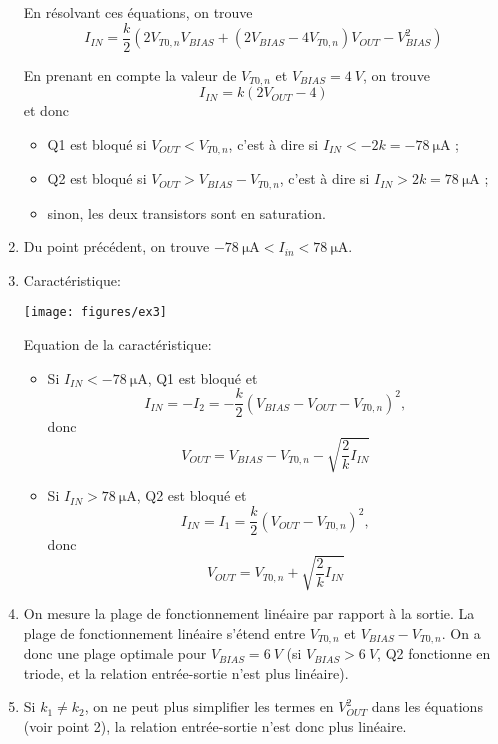 \begin{enumerate}
	En résolvant ces équations, on trouve
	\[I_{IN} = \frac{k}{2}\left(2 V_{T0,n} V_{BIAS} + (2 V_{BIAS} - 4 V_{T0,n}) V_{OUT} - V_{BIAS}
	^2\right)\]

	En prenant en compte la valeur de $V_{T0,n}$ et $V_{BIAS} = \SI{4}{V}$, on trouve
	\[I_{IN} = k\left(2 V_{OUT} - 4\right)\]
	et donc
	\begin{itemize}
		\item Q1 est bloqué si $V_{OUT} < V_{T0,n}$, c'est à dire si
		$I_{IN} < -2k = -\SI{78}{\micro\ampere}$ ;
		\item Q2 est bloqué si $V_{OUT} > V_{BIAS} - V_{T0,n}$, c'est à dire si
		$I_{IN} > 2k = \SI{78}{\micro\ampere}$ ;
		\item sinon, les deux transistors sont en saturation.
	\end{itemize}

	\item Du point précédent, on trouve $-\SI{78}{\micro\ampere} < I_{in} < \SI{78}{\micro\ampere}$.

	\item Caractéristique:
	\begin{center}
		\texttt{[image: figures/ex3]}
	\end{center}

	Equation de la caractéristique:
	\begin{itemize}
    	\item Si $I_{IN} < \SI{-78}{\micro\ampere}$, Q1 est bloqué et
        \[I_{IN} = - I_2 = -\frac{k}{2}\left(V_{BIAS} - V_{OUT} - V_{T0,n}\right)^2,\]
        donc \[V_{OUT} = V_{BIAS} - V_{T0,n} - \sqrt{\frac{2}{k}I_{IN}}\]
    	\item Si $I_{IN} > \SI{78}{\micro\ampere}$, Q2 est bloqué et
        \[I_{IN} = I_1 = \frac{k}{2}\left(V_{OUT} - V_{T0,n}\right)^2,\]
        donc \[V_{OUT} = V_{T0,n} + \sqrt{\frac{2}{k}I_{IN}}\]
	\end{itemize}
	
	\item On mesure la plage de fonctionnement linéaire par rapport à la sortie. La plage de
	fonctionnement linéaire s'étend entre $V_{T0,n}$ et $V_{BIAS} - V_{T0,n}$. On a donc une plage
	optimale pour $V_{BIAS} = \SI{6}{V}$ (si $V_{BIAS} > \SI{6}{V}$, Q2 fonctionne en triode, et la
	relation entrée-sortie n'est plus linéaire).

	\item Si $k_1 \neq k_2$, on ne peut plus simplifier les termes en $V_{OUT}^2$ dans les équations
	(voir point 2), la relation entrée-sortie n'est donc plus linéaire.
\end{enumerate}



